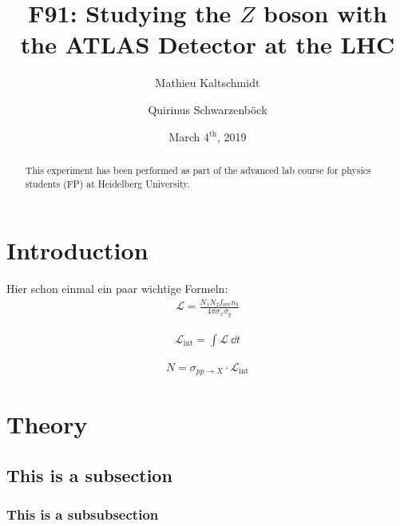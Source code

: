 \documentclass[twocolumn,
			   showpacs,%
               nofootinbib,
               aps,%
               prd,
               notitlepage,
               showkeys,
               10pt]{revtex4-1}
\begin{document}
\title{F91: Studying the $Z$ boson with the ATLAS Detector at the LHC }
\author{Mathieu Kaltschmidt}
\author{Quirinus Schwarzenb\"ock}

\date[Carried out in the week of  ]{March 4$^{\text{th}}$, 2019}


\begin{abstract}
This experiment has been performed as part of the advanced lab course for physics students (FP) at Heidelberg University.

\blindtext
\end{abstract}

\maketitle



\section{Introduction}
Hier schon einmal ein paar wichtige Formeln:
\begin{align}
\mathcal{L} = \frac{N_1N_2f_{\text{rev}}n_b}{4\pi\sigma_x\sigma_y}
\end{align}

\blindtext

\begin{align}
\mathcal{L}_{\text{int}} = \int \mathcal{L} \ \dd t	
\end{align}

\blindtext

\begin{align}
N = \sigma_{pp\rightarrow X} \cdot \mathcal{L}_{\text{int}}
\end{align}


\section{Theory}

\blindtext

\subsection{This is a subsection}

\subsubsection{This is a subsubsection}
\end{document}
